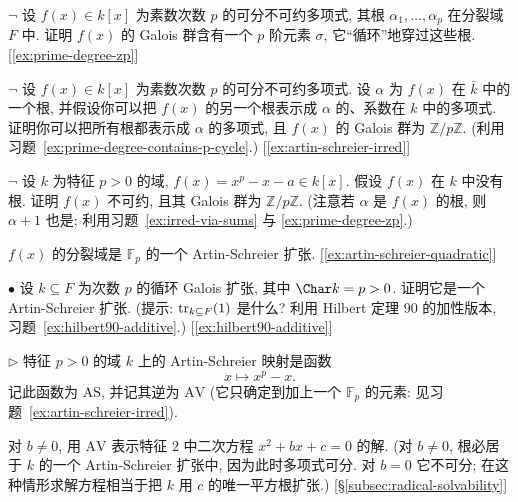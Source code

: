 \begin{prob}\label{ex:prime-degree-contains-p-cycle}
$\neg$ 设 $f(x)\in k[x]$ 为素数次数 $p$ 的可分不可约多项式, 其根 $\alpha_1,\ldots,\alpha_p$ 在分裂域 $F$ 中. 证明 $f(x)$ 的 Galois 群含有一个 $p$ 阶元素 $\sigma$, 它``循环''地穿过这些根. [\ref{ex:prime-degree-zp}]
\end{prob}

\begin{prob}\label{ex:prime-degree-zp}
$\neg$ 设 $f(x)\in k[x]$ 为素数次数 $p$ 的可分不可约多项式. 设 $\alpha$ 为 $f(x)$ 在 $\overline{k}$ 中的一个根, 并假设你可以把 $f(x)$ 的另一个根表示成 $\alpha$ 的、系数在 $k$ 中的多项式. 证明你可以把所有根都表示成 $\alpha$ 的多项式, 且 $f(x)$ 的 Galois 群为 $\mathbb{Z}/p\mathbb{Z}$. (利用习题~\ref{ex:prime-degree-contains-p-cycle}.) [\ref{ex:artin-schreier-irred}]
\end{prob}

\begin{prob}\label{ex:artin-schreier-irred}
$\neg$ 设 $k$ 为特征 $p>0$ 的域, $f(x)=x^p-x-a\in k[x]$. 假设 $f(x)$ 在 $k$ 中没有根. 证明 $f(x)$ 不可约, 且其 Galois 群为 $\mathbb{Z}/p\mathbb{Z}$. (注意若 $\alpha$ 是 $f(x)$ 的根, 则 $\alpha+1$ 也是; 利用习题~\ref{ex:irred-via-sums} 与 \ref{ex:prime-degree-zp}.)

$f(x)$ 的分裂域是 $\mathbb{F}_p$ 的一个 Artin-Schreier 扩张. [\ref{ex:artin-schreier-quadratic}]
\end{prob}

\begin{prob}\label{ex:cyclic-char-p-artin-schreier}
$\bullet$ 设 $k\subseteq F$ 为次数 $p$ 的循环 Galois 扩张, 其中 $\Char k=p>0$. 证明它是一个 Artin-Schreier 扩张. (提示: $\operatorname{tr}_{k\subseteq F}(1)$ 是什么? 利用 Hilbert 定理 90 的加性版本, 习题~\ref{ex:hilbert90-additive}.) [\ref{ex:hilbert90-additive}]
\end{prob}

\begin{prob}\label{ex:artin-schreier-quadratic}
$\triangleright$ 特征 $p>0$ 的域 $k$ 上的 Artin-Schreier 映射是函数
\[
x\longmapsto x^p-x.
\]
记此函数为 $\mathrm{AS}$, 并记其逆为 $\mathrm{AV}$ (它只确定到加上一个 $\mathbb{F}_p$ 的元素: 见习题~\ref{ex:artin-schreier-irred}).

对 $b\neq 0$, 用 $\mathrm{AV}$ 表示特征 $2$ 中二次方程 $x^2+bx+c=0$ 的解. (对 $b\neq 0$, 根必居于 $k$ 的一个 Artin-Schreier 扩张中, 因为此时多项式可分. 对 $b=0$ 它不可分; 在这种情形求解方程相当于把 $k$ 用 $c$ 的唯一平方根扩张.) [§\ref{subsec:radical-solvability}]
\end{prob}

